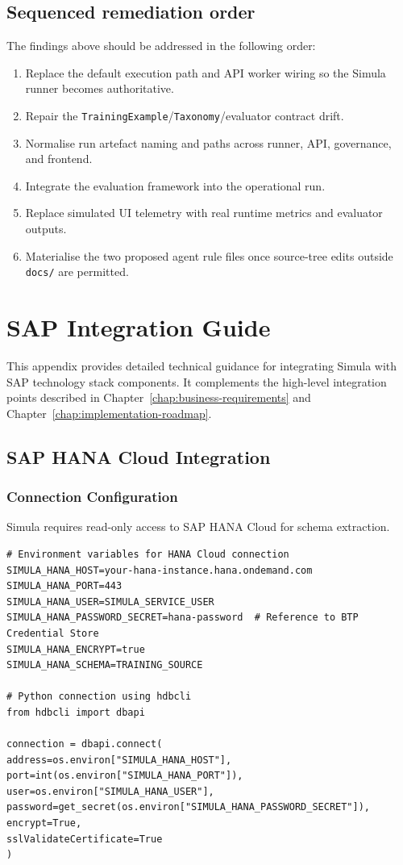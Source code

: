 \documentclass[12pt,a4paper,twoside]{report}
\begin{document}
\section{Sequenced remediation order}
\label{sec:remediation-order}
The findings above should be addressed in the following order:
\begin{enumerate}[label=\arabic*.]
\item Replace the default execution path and API worker wiring so
the Simula runner becomes authoritative.
\item Repair the \texttt{TrainingExample}/\texttt{Taxonomy}/evaluator
contract drift.
\item Normalise run artefact naming and paths across runner, API,
governance, and frontend.
\item Integrate the evaluation framework into the operational run.
\item Replace simulated UI telemetry with real runtime metrics and
evaluator outputs.
\item Materialise the two proposed agent rule files once source-tree
edits outside \texttt{docs/} are permitted.
\end{enumerate}
\chapter{SAP Integration Guide}
\label{chap:sap-integration-guide}

This appendix provides detailed technical guidance for integrating Simula with
SAP technology stack components. It complements the high-level integration
points described in Chapter~\ref{chap:business-requirements} and
Chapter~\ref{chap:implementation-roadmap}.

\section{SAP HANA Cloud Integration}

\subsection{Connection Configuration}

Simula requires read-only access to SAP HANA Cloud for schema extraction.

\begin{lstlisting}[language=jsonx,caption={HANA Cloud connection configuration}]
# Environment variables for HANA Cloud connection
SIMULA_HANA_HOST=your-hana-instance.hana.ondemand.com
SIMULA_HANA_PORT=443
SIMULA_HANA_USER=SIMULA_SERVICE_USER
SIMULA_HANA_PASSWORD_SECRET=hana-password  # Reference to BTP Credential Store
SIMULA_HANA_ENCRYPT=true
SIMULA_HANA_SCHEMA=TRAINING_SOURCE

# Python connection using hdbcli
from hdbcli import dbapi

connection = dbapi.connect(
address=os.environ["SIMULA_HANA_HOST"],
port=int(os.environ["SIMULA_HANA_PORT"]),
user=os.environ["SIMULA_HANA_USER"],
password=get_secret(os.environ["SIMULA_HANA_PASSWORD_SECRET"]),
encrypt=True,
sslValidateCertificate=True
)
\end{lstlisting}
\end{document}
